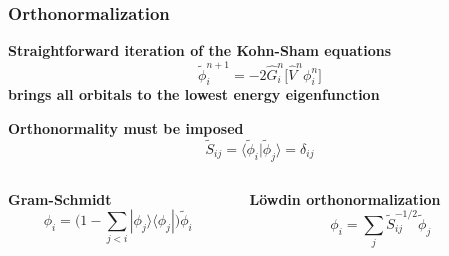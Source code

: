 \begin{frame}
    \frametitle{Orthonormalization}
    \centering
    \textbf{Straightforward iteration of the Kohn-Sham equations}
    \begin{equation}
        \nonumber
        \tilde{\phi}_i^{n+1} = -2\hat{G}_i^n \bigg[\hat{V}^n\phi_i^n\bigg]
    \end{equation}
    \textbf{brings all orbitals to the lowest energy eigenfunction}
    
    \vspace{15mm}

    \textbf{Orthonormality must be imposed}
    \begin{equation}
        \nonumber
        \tilde{S}_{ij} = \langle\tilde{\phi}_i|\tilde{\phi}_j\rangle = \delta_{ij}
    \end{equation}

    \vspace{5mm}

    \begin{columns}
    \begin{column}[b]{0.5\linewidth}
    \centering
    \textbf{Gram-Schmidt}
    \begin{equation}
	\nonumber
	\phi_i = \Big(1 - \sum_{j<i}|\phi_j\rangle\langle\phi_j|\Big)\tilde{\phi}_i
    \end{equation}
    \end{column}

    \begin{column}[b]{0.5\linewidth}
    \centering
    \textbf{L\"{o}wdin orthonormalization}
    \begin{equation}
	\nonumber
	\phi_i = \sum_j \tilde{S}_{ij}^{-1/2}\tilde{\phi}_j
    \end{equation}
    \end{column}
    \end{columns}
\end{frame}

